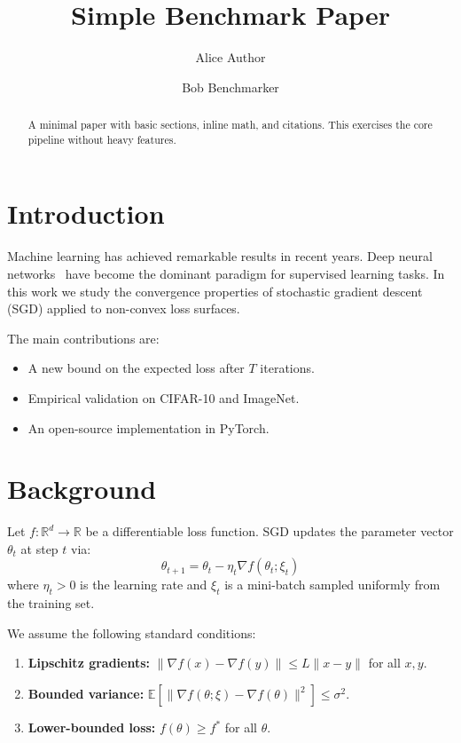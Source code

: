 \documentclass{article}
\title{Simple Benchmark Paper}
\author{Alice Author \and Bob Benchmarker}
\begin{document}
\maketitle
\begin{abstract}
A minimal paper with basic sections, inline math, and citations.
This exercises the core pipeline without heavy features.
\end{abstract}

\section{Introduction}
\label{sec:intro}

Machine learning has achieved remarkable results in recent years.
Deep neural networks~\cite{lecun2015deep} have become the dominant
paradigm for supervised learning tasks.  In this work we study the
convergence properties of stochastic gradient descent (SGD) applied
to non-convex loss surfaces.

The main contributions are:
\begin{itemize}
\item A new bound on the expected loss after $T$ iterations.
\item Empirical validation on CIFAR-10 and ImageNet.
\item An open-source implementation in PyTorch.
\end{itemize}

\section{Background}
\label{sec:background}

Let $f: \mathbb{R}^d \to \mathbb{R}$ be a differentiable loss function.
SGD updates the parameter vector $\theta_t$ at step $t$ via:
\[
\theta_{t+1} = \theta_t - \eta_t \nabla f(\theta_t; \xi_t)
\]
where $\eta_t > 0$ is the learning rate and $\xi_t$ is a mini-batch
sampled uniformly from the training set.

We assume the following standard conditions:
\begin{enumerate}
\item \textbf{Lipschitz gradients:} $\|\nabla f(x) - \nabla f(y)\| \leq L\|x - y\|$ for all $x, y$.
\item \textbf{Bounded variance:} $\mathbb{E}[\|\nabla f(\theta; \xi) - \nabla f(\theta)\|^2] \leq \sigma^2$.
\item \textbf{Lower-bounded loss:} $f(\theta) \geq f^*$ for all $\theta$.
\end{enumerate}
\end{document}
